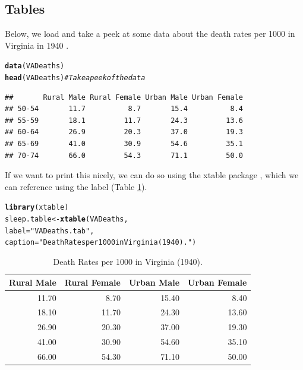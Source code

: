\documentclass{article}\usepackage[]{graphicx}\usepackage[]{xcolor}
\makeatletter
\newcommand{\hlsng}[1]{\textcolor[rgb]{0.192,0.494,0.8}{#1}}%
\newcommand{\hlcom}[1]{\textcolor[rgb]{0.678,0.584,0.686}{\textit{#1}}}%
\newcommand{\hldef}[1]{\textcolor[rgb]{0.345,0.345,0.345}{#1}}%
\newcommand{\hlkwb}[1]{\textcolor[rgb]{0.69,0.353,0.396}{#1}}%
\newcommand{\hlkwc}[1]{\textcolor[rgb]{0.333,0.667,0.333}{#1}}%
\newcommand{\hlkwd}[1]{\textcolor[rgb]{0.737,0.353,0.396}{\textbf{#1}}}%
\newenvironment{kframe}{%
 \def\at@end@of@kframe{}%
 \ifinner\ifhmode%
  \def\at@end@of@kframe{\end{minipage}}%
  \begin{minipage}{\columnwidth}%
 \fi\fi%
 \def\FrameCommand##1{\hskip\@totalleftmargin \hskip-\fboxsep
 \colorbox{shadecolor}{##1}\hskip-\fboxsep
     \hskip-\linewidth \hskip-\@totalleftmargin \hskip\columnwidth}%
 \MakeFramed {\advance\hsize-\width
   \@totalleftmargin\z@ \linewidth\hsize
   \@setminipage}}%
 {\par\unskip\endMakeFramed%
 \at@end@of@kframe}
\newenvironment{knitrout}{}{} %
\makeatother
\begin{document}
\begin{multicols}{2}
\subsection{Tables}
Below, we load and take a peek at some data about the death rates per 1000 in Virginia in 1940 \citep{9abfb448-e032-3b5b-972c-40954bc7e23c}.
\begin{knitrout}\scriptsize
{}\color{fgcolor}\begin{kframe}
\begin{alltt}
\hlkwd{data}\hldef{(VADeaths)}
\hlkwd{head}\hldef{(VADeaths)} \hlcom{# Take a peek of the data}
\end{alltt}
\begin{verbatim}
##       Rural Male Rural Female Urban Male Urban Female
## 50-54       11.7          8.7       15.4          8.4
## 55-59       18.1         11.7       24.3         13.6
## 60-64       26.9         20.3       37.0         19.3
## 65-69       41.0         30.9       54.6         35.1
## 70-74       66.0         54.3       71.1         50.0
\end{verbatim}
\end{kframe}
\end{knitrout}

If we want to print this nicely, we can do so using the xtable package \citep{xtable}, which we can reference using the label (Table \href{VADeaths.tab} 1). 
\begin{knitrout}\scriptsize
{}\color{fgcolor}\begin{kframe}
\begin{alltt}
\hlkwd{library}\hldef{(xtable)}
\hldef{sleep.table}\hlkwb{<-}\hlkwd{xtable}\hldef{(VADeaths ,}
                    \hlkwc{label} \hldef{=} \hlsng{"VADeaths.tab"}\hldef{,}
                    \hlkwc{caption} \hldef{=} \hlsng{"Death Rates per 1000 in Virginia (1940)."}\hldef{)}
\end{alltt}
\end{kframe}
\end{knitrout}
\begin{table}[H]
\centering
\begingroup\small
\begin{tabular}{rrrr}
  \hline
Rural Male & Rural Female & Urban Male & Urban Female \\ 
  \hline
11.70 & 8.70 & 15.40 & 8.40 \\ 
  18.10 & 11.70 & 24.30 & 13.60 \\ 
  26.90 & 20.30 & 37.00 & 19.30 \\ 
  41.00 & 30.90 & 54.60 & 35.10 \\ 
  66.00 & 54.30 & 71.10 & 50.00 \\ 
   \hline
\end{tabular}
\endgroup
\caption{Death Rates per 1000 in Virginia (1940).} 
\label{VADeaths.tab}
\end{table}



\end{multicols}
\end{document}
